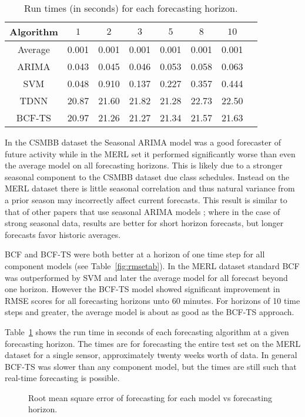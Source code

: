\begin{table}
\centering
\caption{Run times (in seconds) for each forecasting horizon.}
\begin{tabular}{|c|c|c|c|c|c|c|c|} \hline
Algorithm & $1$ & $2$ & $3$ & $5$ & $8$ & $10$ \\ \hline
Average & 0.001 & 0.001 & 0.001 & 0.001 & 0.001 & 0.001 \\ \hline
ARIMA & 0.043 & 0.045 & 0.046 & 0.053 & 0.058 & 0.063\\ \hline
SVM & 0.048 & 0.910 & 0.137 & 0.227 & 0.357 & 0.444 \\ \hline
TDNN & 20.87 & 21.60 & 21.82 & 21.28 & 22.73 & 22.50 \\ \hline
BCF-TS & 20.97 & 21.26 & 21.27 & 21.34 & 21.57 & 21.63\\ \hline
\end{tabular}
\label{fig:runtimestab}
\end{table}

In the CSMBB dataset the Seasonal ARIMA model was a good forecaster of future activity while in the MERL set it performed significantly worse than even the average model on all forecasting horizons.  This is likely due to a stronger seasonal component to the CSMBB dataset due class schedules.  Instead on the MERL dataset there is little seasonal correlation and thus natural variance from a prior season may incorrectly affect current forecasts.  This result is similar to that of other papers that use seasonal ARIMA models \cite{Newsham2010}; where in the case of strong seasonal data, results are better for short horizon forecasts, but longer forecasts favor historic averages.

BCF and BCF-TS were both better at a horizon of one time step for all component models (see Table~\ref{fig:rmsetab}).  In the MERL dataset standard BCF was outperformed by SVM and later the average model for all forecast beyond one horizon.  However the BCF-TS model showed significant improvement in RMSE scores for all forecasting horizons unto 60 minutes.  For horizons of 10 time steps and greater, the average model is about as good as the BCF-TS approach.

Table~\ref{fig:runtimestab} shows the run time in seconds of each forecasting algorithm at a given forecasting horizon.  The times are for forecasting the entire test set on the MERL dataset for a single sensor, approximately twenty weeks worth of data.  In general BCF-TS was slower than any component model, but the times are still such that real-time forecasting is possible.

\begin{figure}[!ht]
	\begin{center}
	\end{center}
	\caption{Root mean square error of forecasting for each model vs forecasting horizon.}
	\label{fig:rmseplot}
\end{figure}


